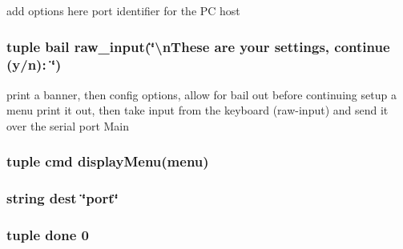 add options here port identifier for the P\-C host 

\hypertarget{namespace_lab1__483__pyinterface_a67d4d94f824d1bec4405ed3b46596d5b}{
\subsubsection[{bail}]{\setlength{\rightskip}{0pt plus 5cm}tuple bail raw\-\_\-input(\char`\"{}\textbackslash{}n\-These are your settings, continue (y/n)\-: \char`\"{})}}\label{namespace_lab1__483__pyinterface_a67d4d94f824d1bec4405ed3b46596d5b}


print a banner, then config options, allow for bail out before continuing setup a menu print it out, then take input from the keyboard (raw-\/input) and send it over the serial port Main 

\hypertarget{namespace_lab1__483__pyinterface_acb0104594e2a37355704eb5ce2484ec1}{
\subsubsection[{cmd}]{\setlength{\rightskip}{0pt plus 5cm}tuple cmd {\bf display\-Menu}({\bf menu})}}\label{namespace_lab1__483__pyinterface_acb0104594e2a37355704eb5ce2484ec1}
\hypertarget{namespace_lab1__483__pyinterface_a66d4da94e0e4f717ff3e7f23c53f7c2d}{
\subsubsection[{dest}]{\setlength{\rightskip}{0pt plus 5cm}string dest \char`\"{}port\char`\"{}}}\label{namespace_lab1__483__pyinterface_a66d4da94e0e4f717ff3e7f23c53f7c2d}
\hypertarget{namespace_lab1__483__pyinterface_a3bb13bb432a56b973125d7138b68206d}{
\subsubsection[{done}]{\setlength{\rightskip}{0pt plus 5cm}tuple done 0}}\label{namespace_lab1__483__pyinterface_a3bb13bb432a56b973125d7138b68206d}


